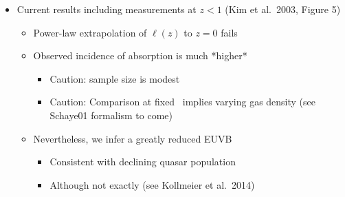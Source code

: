 \documentclass[12pt,letterpaper]{article}
\begin{document}
\begin{Aenumerate}
\begin{itemize}
\begin{itemize}
		\item Current results including measurements at $z<1$ (Kim et al.\ 2003, Figure 5)
			\begin{itemize}
			\item Power-law extrapolation of $\ell(z)$ to $z=0$ fails
			\item Observed incidence of absorption is much *higher*
				\begin{itemize}
				\item Caution: sample size is modest
				\item Caution: Comparison at fixed \nhi\ implies varying gas density (see Schaye01 formalism to come)
				\end{itemize}
			\item Nevertheless, we infer a greatly reduced EUVB
				\begin{itemize}
				\item Consistent with declining quasar population
				\item Although not exactly (see Kollmeier et al.\ 2014)
				\end{itemize}
			\end{itemize}


		\end{itemize}
	\end{itemize}


\end{Aenumerate}
\end{document}
